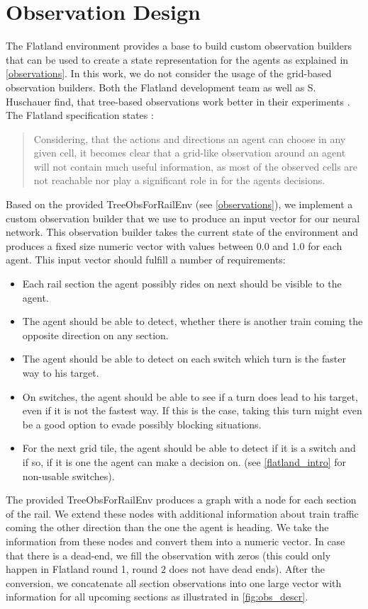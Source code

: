 \section{Observation Design}\label{enhanced_observations}
The Flatland environment provides a base to build custom observation builders that can be used to create a state representation for the agents as explained in \autoref{observations}. In this work, we do not consider the usage of the grid-based observation builders.
Both the Flatland development team as well as S. Huschauer find, that tree-based observations work better in their experiments \cite{flatlandstephan}. The Flatland specification states \cite{flatland_spec}:
\begin{quote}
	Considering, that the actions and directions an agent can choose in any given cell, it becomes clear that a grid-like observation around an agent will not contain much useful information, as most of the observed cells are not reachable nor play a significant role in for the agents decisions.
\end{quote}
Based on the provided TreeObsForRailEnv (see \autoref{observations}), we implement a custom observation builder that we use to produce an input vector for our neural network. This observation builder takes the current state of the environment and produces a fixed size numeric vector with values between 0.0 and 1.0 for each agent. This input vector should fulfill a number of requirements:
\begin{itemize}
	\item Each rail section the agent possibly rides on next should be visible to the agent.
	\item The agent should be able to detect, whether there is another train coming the opposite direction on any section.
	\item The agent should be able to detect on each switch which turn is the faster way to his target.
	\item On switches, the agent should be able to see if a turn does lead to his target, even if it is not the fastest way. If this is the case, taking this turn might even be a good option to evade possibly blocking situations.
	\item For the next grid tile, the agent should be able to detect if it is a switch and if so, if it is one the agent can make a decision on. (see \autoref{flatland_intro} for non-usable switches).
\end{itemize}
The provided TreeObsForRailEnv produces a graph with a node for each section of the rail. We extend these nodes with additional information about train traffic coming the other direction than the one the agent is heading. We take the information from these nodes and convert them into a numeric vector. In case that there is a dead-end, we fill the observation with zeros (this could only happen in Flatland round 1, round 2 does not have dead ends). After the conversion, we concatenate all section observations into one large vector with information for all upcoming sections as illustrated in \autoref{fig:obs_descr}.\\
